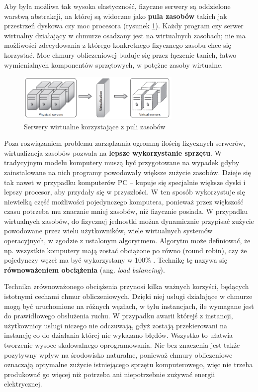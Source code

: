 \documentclass[12pt,a4paper,twoside,titlepage,openright]{book}
\begin{document}
Aby była możliwa tak wysoka elastyczność, fizyczne serwery są oddzielone warstwą abstrakcji, na której są widoczne jako \textbf{pula zasobów} takich jak przestrzeń dyskowa czy moc procesora (rysunek \ref{fig:pooling}). Każdy program czy serwer wirtualny działający w chmurze osadzany jest na wirtualnych zasobach; nie ma możliwości zdecydowania z którego konkretnego fizycznego zasobu chce się korzystać. Moc chmury obliczeniowej buduje się przez łączenie tanich, łatwo wymienialnych komponentów sprzętowych, w potężne zasoby wirtualne. \cite{ccCambridge}

\begin{figure}[h]
	\centering
			\includegraphics[width=0.7\textwidth]{pooling.png}
		\caption{Serwery wirtualne korzystające z puli zasobów \cite{ccCambridge}}
		\label{fig:pooling}
\end{figure}

Poza rozwiązaniem problemu zarządzania ogromną ilością fizycznych serwerów, wirtualizacja zasobów pozwala na \textbf{lepsze wykorzystanie sprzętu}. W tradycyjnym modelu komputery muszą być przygotowane na wypadek gdyby zainstalowane na nich programy powodowały większe zużycie zasobów. Dzieje się tak nawet w przypadku komputerów PC -- kupuje się specjalnie większe dyski i lepszy procesor, aby przydały się w przyszłości. W ten sposób wykorzystuje się niewielką część możliwości pojedynczego komputera, ponieważ przez większość czasu potrzeba mu znacznie mniej zasobów, niż fizycznie posiada. W przypadku wirtualnych zasobów, do fizycznej jednostki można dynamicznie przypisać zużycie powodowane przez wielu użytkowników, wiele wirtualnych systemów operacyjnych, w zgodzie z ustalonym algorytmem. Algorytm może definiować, że np. wszystkie komputery mają zostać obciążone po równo (round robin), czy że pojedynczy węzeł ma być wykorzystany w 100\% \cite{cloudFoundry}. Technikę tę nazywa się \textbf{równoważeniem obciążenia} (ang. \textit{load balancing}).

Technika zrównoważonego obciążenia przynosi kilka ważnych korzyści, będących istotnymi cechami chmur obliczeniowych. Dzięki niej usługi działające w chmurze mogą być uruchomione na różnych węzłach, w tylu instancjach, ile wymagane jest do prawidłowego obsłużenia ruchu. W przypadku awarii którejś z instancji, użytkownicy usługi niczego nie odczuwają, gdyż zostają przekierowani na instancję co do działania której nie wykazano błędów. Wszystko to ułatwia tworzenie wysoce skalowalnego oprogramowania. Nie bez znaczenia jest także pozytywny wpływ na środowisko naturalne, ponieważ chmury obliczeniowe oznaczają optymalne zużycie istniejącego sprzętu komputerowego, więc nie trzeba produkować go więcej niż potrzeba ani niepotrzebnie zużywać energii elektrycznej.
\end{document}
